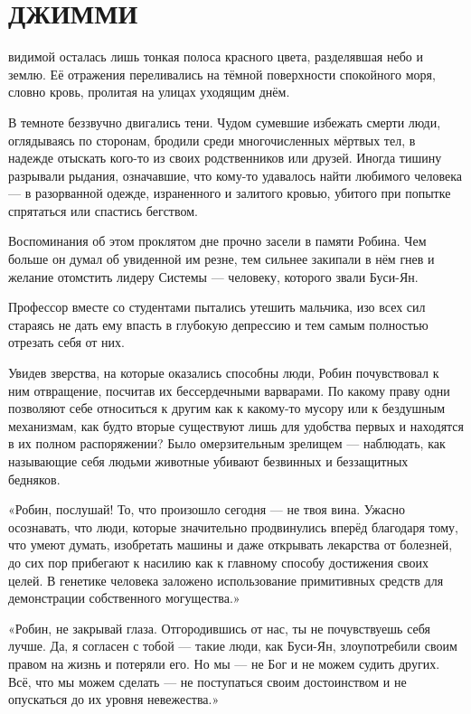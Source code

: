 \documentclass[a4paper,12pt]{book}
\begin{document}
\chapter{ДЖИММИ}
\noindent{} видимой осталась лишь тонкая полоса красного цвета, разделявшая небо и землю. Её отражения переливались на тёмной поверхности спокойного моря, словно кровь, пролитая на улицах уходящим днём.
\par
В темноте беззвучно двигались тени. Чудом сумевшие избежать смерти люди, оглядываясь по сторонам, бродили среди многочисленных мёртвых тел, в надежде отыскать кого-то из своих родственников или друзей. Иногда тишину разрывали рыдания, означавшие, что кому-то удавалось найти любимого человека — в разорванной одежде, израненного и залитого кровью, убитого при попытке спрятаться или спастись бегством.
\par
Воспоминания об этом проклятом дне прочно засели в памяти Робина. Чем больше он думал об увиденной им резне, тем сильнее закипали в нём гнев и желание отомстить лидеру Системы — человеку, которого звали Буси-Ян.
\par
Профессор вместе со студентами пытались утешить мальчика, изо всех сил стараясь не дать ему впасть в глубокую депрессию и тем самым полностью отрезать себя от них.
\par
Увидев зверства, на которые оказались способны люди, Робин почувствовал к ним отвращение, посчитав их бессердечными варварами. По какому праву одни позволяют себе относиться к другим как к какому-то мусору или к бездушным механизмам, как будто вторые существуют лишь для удобства первых и находятся в их полном распоряжении? Было омерзительным зрелищем — наблюдать, как называющие себя людьми животные убивают 
безвинных и беззащитных бедняков.\\
\par
«Робин, послушай! То, что произошло сегодня — не твоя вина. Ужасно осознавать, что люди, которые значительно продвинулись вперёд благодаря тому, что умеют думать, изобретать машины и даже открывать лекарства от болезней, до сих пор прибегают к насилию как к главному способу достижения своих целей. В генетике человека заложено использование примитивных средств для демонстрации собственного могущества.»
\par
«Робин, не закрывай глаза. Отгородившись от нас, ты не почувствуешь себя лучше. Да, я согласен с тобой — такие люди, как Буси-Ян, злоупотребили своим правом на жизнь и потеряли его. Но мы — не Бог и не можем судить других. Всё, что мы можем сделать — не поступаться своим достоинством и не опускаться до их уровня невежества.»
\end{document}
